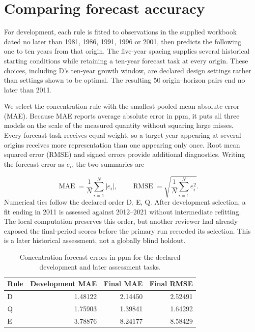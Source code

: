 \documentclass[11pt,a4paper]{article}
\newcommand{\p}[2]{#2\par}
\newcommand{\txt}[2]{#2}
\begin{document}
\section{Comparing forecast accuracy}\label{sec:validation}
\p{VAL01}{For development, each rule is fitted to observations in the supplied workbook dated no later than 1981, 1986, 1991, 1996 or 2001, then predicts the following one to ten years from that origin. The five-year spacing supplies several historical starting conditions while retaining a ten-year forecast task at every origin. These choices, including D's ten-year growth window, are declared design settings rather than settings shown to be optimal. The resulting 50 origin--horizon pairs end no later than 2011.}
\p{VAL02}{We select the concentration rule with the smallest pooled mean absolute error (MAE). Because MAE reports average absolute error in ppm, it puts all three models on the scale of the measured quantity without squaring large misses. Every forecast task receives equal weight, so a target year appearing at several origins receives more representation than one appearing only once. Root mean squared error (RMSE) and signed errors provide additional diagnostics. Writing the forecast error as $e_i$, the two summaries are}
\begin{equation}\label{eq:errors}
\operatorname{MAE}=\frac{1}{N}\sum_{i=1}^{N}|e_i|,\qquad
\operatorname{RMSE}=\sqrt{\frac{1}{N}\sum_{i=1}^{N}e_i^2}.
\end{equation}
\p{VAL03}{Numerical ties follow the declared order D, E, Q. After development selection, a fit ending in 2011 is assessed against 2012--2021 without intermediate refitting. The local computation preserves this order, but another reviewer had already exposed the final-period scores before the primary run recorded its selection. This is a later historical assessment, not a globally blind holdout.}
\begin{table}[H]\centering\small
\caption{\txt{TC04}{Concentration forecast errors in ppm for the declared development and later assessment tasks.}}\label{tab:co2-errors}
\begin{tabular}{lrrr}\toprule
Rule & Development MAE & Final MAE & Final RMSE\\\midrule
D & 1.48122 & 2.14450 & 2.52491\\
Q & 1.75903 & 1.39841 & 1.64292\\
E & 3.78876 & 8.24177 & 8.58429\\\bottomrule
\end{tabular}
\end{table}
\end{document}
